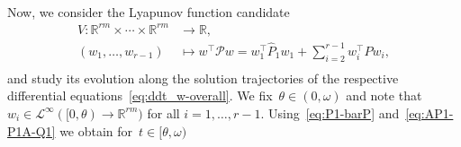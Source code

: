 \documentclass[ envcountsect, envcountsame]{svjour3}
\newcommand{\R}{\mathbb{R}}
\newcommand{\cL}{\mathcal{L}}
\newcommand{\cP}{\mathcal{P}}
\begin{document}
\ \\
Now, we consider the Lyapunov function candidate
\begin{equation*}
\begin{aligned}
V: \R^{rm} \times \cdots \times \R^{rm} &\to \R, \\
(w_1,\ldots,w_{r-1}) &\mapsto w^\top \cP w = w_1^\top \hat P_1 w_1 + \sum_{i=2}^{r-1} w_i^\top \hat P w_i , \\
\end{aligned}
\end{equation*}
and study its evolution along the solution trajectories of the respective differential equations~\eqref{eq:ddt_w-overall}. 
We fix~$\theta \in (0,\omega)$ and note that~$w_i \in \cL^\infty([0,\theta) \to \R^{rm})$ for all $i=1,\ldots,r-1$. 
Using~\eqref{eq:P1-barP} and~\eqref{eq:AP1-P1A-Q1} we obtain for~$t \in [\theta, \omega)$
\end{document}
